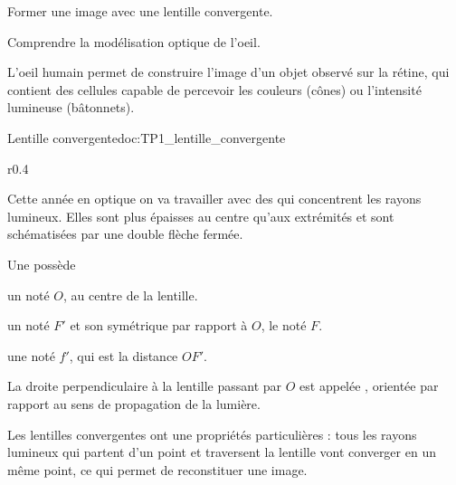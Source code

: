 \teteSndLumi
\vspace*{-24pt}



\vspace*{-4pt}
\begin{objectifs}
  \item Former une image avec une lentille convergente.
  \item Comprendre la modélisation optique de l'oeil.
\end{objectifs}

\begin{contexte}
  L'oeil humain permet de construire l'image d'un objet observé sur la rétine, qui contient des cellules capable de percevoir les couleurs (cônes) ou l'intensité lumineuse (bâtonnets).
  
\end{contexte}


\begin{doc}{Lentille convergente}{doc:TP1_lentille_convergente}
  \begin{wrapfigure}[4]{r}{0.4\linewidth}
    \centering
    \vspace*{-42pt}
  \end{wrapfigure}
  
  Cette année en optique on va travailler avec des  qui concentrent les rayons lumineux.
  Elles sont plus épaisses au centre qu'aux extrémités et sont schématisées par une double flèche fermée.

  \begin{importants}
    Une  possède
    \begin{listePoints}
      \item un  noté $O$, au centre de la lentille. 
      \item un  noté $F'$ et son symétrique par rapport à $O$, le  noté $F$.
      \item une  noté $f'$, qui est la distance $OF'$.
    \end{listePoints}
    
    La droite perpendiculaire à la lentille passant par $O$ est appelée , orientée par rapport au sens de propagation de la lumière.
  \end{importants}

  Les lentilles convergentes ont une propriétés particulières : tous les rayons lumineux qui partent d'un point et traversent la lentille vont converger en un même point, ce qui permet de reconstituer une image.
\end{doc}

